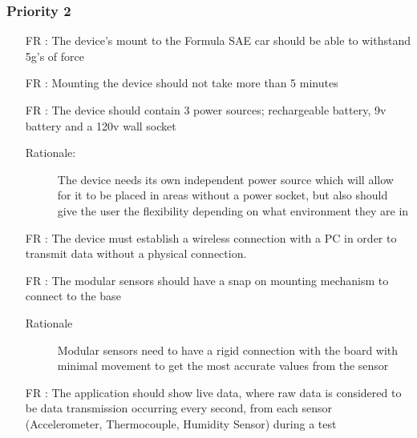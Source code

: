 \documentclass[12pt]{article}
\newcounter{reqnum} %
\begin{document}
\newpage

\subsubsection{Priority 2}
\begin{itemize}

  \item[FR \refstepcounter{reqnum}\thereqnum:] The device's mount to the Formula SAE car should be able to withstand 5g's of force
  
  \item[FR \refstepcounter{reqnum}\thereqnum:] Mounting the device should not take more than 5 minutes

  \item[FR \refstepcounter{reqnum}\thereqnum:] The device should contain 3 power sources; rechargeable battery, 9v battery and a 120v wall socket
  \begin{description} \item[Rationale:] The device needs its own independent power source which will allow for it to be placed in areas without a power socket, but also should give the user the flexibility depending on what environment they are in \end{description}

  \item[FR \refstepcounter{reqnum}\thereqnum:] The device must establish a wireless connection with a PC in order to transmit data without a physical connection.
  
  \item[FR \refstepcounter{reqnum}\thereqnum:] The modular sensors should have a snap on mounting mechanism to connect to the base
  \begin{description} \item[Rationale] Modular sensors need to have a rigid connection with the board with minimal movement to get the most accurate values from the sensor  \end{description}

  \item[FR \refstepcounter{reqnum}\thereqnum:] The application should show live data, where raw data is considered to be data transmission occurring every second,  from each sensor (Accelerometer, Thermocouple, Humidity Sensor) during a test

  \end{itemize}
\end{document}
